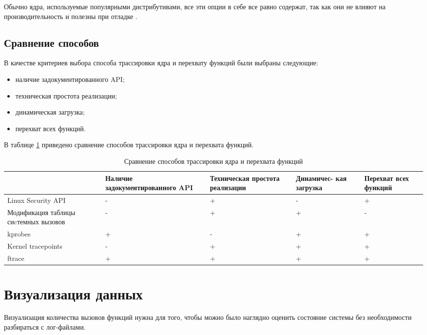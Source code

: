 Обычно ядра, используемые популярными дистрибутивами, все эти опции в себе все равно содержат, так как они не влияют на производительность и полезны при отладке \cite{core_ftrace}.

\subsection{Сравнение способов}

В качестве критериев выбора способа трассировки ядра и перехвату функций были выбраны следующие:

\begin{itemize}
	\item наличие задокументированного API;
	\item техническая простота реализации;
	\item динамическая загрузка;
	\item перехват всех функций.
\end{itemize}

В таблице \ref{class} приведено сравнение способов трассировки ядра и перехвата функций.

\begin{table}[H]
	\caption{Сравнение способов трассировки ядра и перехвата функций}
	\label{class}
	\begin{center}
		\begin{tabular}{| p{3 cm} | p{2.5 cm} | p{2.5 cm} | p{2.5 cm} | p{2.5 cm} |} 
			\hline
			& Наличие задокументированного API & Техническая простота реализации & Динамичес- кая загрузка & Перехват всех функций \\
			\hline
			Linux Security API & - & + & - & + \\
			\hline
			Модификация таблицы сиcтемных вызовов & - & + & + & - \\
			\hline
			kprobes & + & - & + & + \\
			\hline
			Kernel tracepoints & - & + & + & + \\
			\hline
			ftrace & + & + & + & + \\
			\hline
		\end{tabular}
	\end{center}
\end{table}

\section{Визуализация данных}

Визуализация количества вызовов функций нужна для того, чтобы можно было наглядно оценить состояние системы без необходимости разбираться с лог-файлами. 


